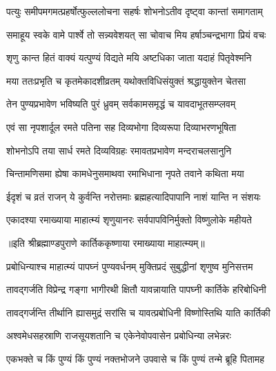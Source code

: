 \twolineshloka
{पत्युः समीपमगमत्प्रहर्षोत्फुल्ललोचना}
{सहर्षः शोभनोऽतीव दृष्ट्वा कान्तां समागताम्} %

\twolineshloka
{समाहूय स्वके वामे पार्श्वे तो सन्न्यवेशयत्}
{सा चोवाच मिय हर्षाञ्चन्द्रभागा प्रियं वचः} %

\twolineshloka
{शृणु कान्त हितं वाक्यं यत्पुण्यं विद्यते मयि}
{अष्टधिका जाता यदाहं पितृवेश्मनि} %

\twolineshloka
{मया ततःप्रभृति च कृतमेकादशीव्रतम्}
{यथोक्तविधिसंयुक्तं श्रद्धायुक्तेन चेतसा} %

\twolineshloka
{तेन पुण्यप्रभावेण भविष्यति पुरं ध्रुवम्}
{सर्वकामसमृद्धं च यावदाभूतसम्प्लवम्} %

\twolineshloka
{एवं सा नृपशार्दूल रमते पतिना सह}
{दिव्यभोगा दिव्यरूपा दिव्याभरणभूषिता} %

\twolineshloka
{शोभनोऽपि तया सार्ध रमते दिव्यविग्रहः}
{रमावतप्रभावेण मन्दराचलसानुनि} %

\twolineshloka
{चिन्तामणिसमा ह्येषा कामधेनुसमाथवा}
{रमाभिधाना नृपते तवाने कथिता मया} %

\twolineshloka
{ईदृशं च व्रतं राजन् ये कुर्वन्ति नरोत्तमाः}
{ब्रह्महत्यादिपापानि नाशं यान्ति न संशयः} %

\twolineshloka
{एकादश्या रमाख्याया माहात्म्यं शृणुयानरः}
{सर्वपापविनिर्मुक्तो विष्णुलोके महीयते} %

॥इति श्रीब्रह्माण्डपुराणे कार्तिककृष्णाया रमाख्याया माहात्म्यम्॥


\hyperref[sec:ekadashi_mahatmyam_vrata_raja]{\closesub}
\clearpage

\label{sec:vrata-raja-karttika-shukla-prabodhini}


\twolineshloka
{प्रबोधिन्याश्च माहात्म्यं पापघ्नं पुण्यवर्धनम्}
{मुक्तिप्रदं सुबुद्धीनां शृणुष्व मुनिसत्तम} %

\twolineshloka
{तावद्गर्जति विप्रेन्द्र गङ्गा भागीरथी क्षितौ}
{यावन्नायाति पापघ्नी कार्तिके हरिबोधिनी} %

\twolineshloka
{तावद्गर्जन्ति तीर्थानि ह्यासमुद्रं सरांसि च}
{यावत्प्रबोधिनी विष्णोस्तिथि याति कार्तिकी} %

\twolineshloka
{अश्वमेधसहस्राणि राजसूयशतानि च}
{एकेनेवोपवासेन प्रबोधिन्या लभेन्नरः} %


\twolineshloka
{एकभक्ते च किं पुण्यं किं पुण्यं नक्तभोजने}
{उपवासे च किं पुण्यं तन्मे ब्रूहि पितामह} %

